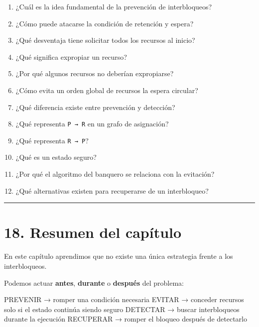 \documentclass[
  spanish,
  letterpaper,
]{scrbook}
\newenvironment{Shaded}{\begin{snugshade}}{\end{snugshade}}
\newcommand{\NormalTok}[1]{\textcolor[rgb]{0.00,0.23,0.31}{#1}}
\providecommand{\tightlist}{%
  \setlength{\itemsep}{0pt}\setlength{\parskip}{0pt}}
\begin{document}
\begin{enumerate}
\def\labelenumi{\arabic{enumi}.}
\tightlist
\item
  ¿Cuál es la idea fundamental de la prevención de interbloqueos?
\item
  ¿Cómo puede atacarse la condición de retención y espera?
\item
  ¿Qué desventaja tiene solicitar todos los recursos al inicio?
\item
  ¿Qué significa expropiar un recurso?
\item
  ¿Por qué algunos recursos no deberían expropiarse?
\item
  ¿Cómo evita un orden global de recursos la espera circular?
\item
  ¿Qué diferencia existe entre prevención y detección?
\item
  ¿Qué representa \texttt{P\ →\ R} en un grafo de asignación?
\item
  ¿Qué representa \texttt{R\ →\ P}?
\item
  ¿Qué es un estado seguro?
\item
  ¿Por qué el algoritmo del banquero se relaciona con la evitación?
\item
  ¿Qué alternativas existen para recuperarse de un interbloqueo?
\end{enumerate}

\begin{center}\rule{0.5\linewidth}{0.5pt}\end{center}


\chapter{18. Resumen del capítulo}\label{resumen-del-capuxedtulo-3}

En este capítulo aprendimos que no existe una única estrategia frente a
los interbloqueos.

Podemos actuar \textbf{antes}, \textbf{durante} o \textbf{después} del
problema:

\begin{Shaded}
\begin{Highlighting}[]
\NormalTok{PREVENIR  → romper una condición necesaria}
\NormalTok{EVITAR    → conceder recursos solo si el estado continúa siendo seguro}
\NormalTok{DETECTAR  → buscar interbloqueos durante la ejecución}
\NormalTok{RECUPERAR → romper el bloqueo después de detectarlo}
\end{Highlighting}
\end{Shaded}
\end{document}
